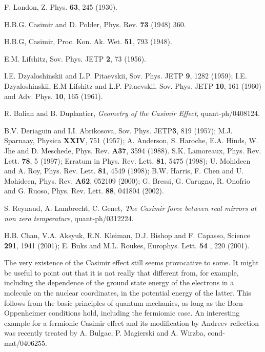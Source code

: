 \documentclass[prl,nofootinbib,twocolumn,showpacs]{revtex4}
\begin{document}
\begin{thebibliography}{99}
 F. London, Z. Phys. {\bf 63}, 245 (1930).

 H.B.G. Casimir and D. Polder, Phys. Rev. {\bf 73} (1948) 360.

 H.B.G, Casimir, Proc. Kon. Ak. Wet. {\bf 51}, 793 (1948).

 E.M. Lifshitz, Sov. Phys. JETP {\bf 2}, 73 (1956).

 I.E. Dzyaloshinskii and L.P. Pitaevskii, Sov. Phys. JETP
{\bf 9}, 1282 (1959); I.E. Dzyaloshinskii, E.M Lifshitz and L.P. Pitaevskii, Sov. Phys. JETP {\bf 10}, 161 (1960) and Adv. Phys. {\bf 10}, 165 (1961).

 R. Balian and B. Duplantier, {\it Geometry of the Casimir Effect},
quant-ph/0408124.

  B.V. Deriaguin and I.I. Abrikosova, Sov. Phys. JETP{\bf  3},
819 (1957); M.J. Sparnaay, Physica {\bf XXIV}, 751 (1957);
A. Anderson, S. Haroche, E.A. Hinds, W. Jhe and D. Meschede, Phys. Rev. {\bf A37}, 3594
(1988).
S.K. Lamoreaux, Phys. Rev. Lett. {\bf 78}, 5 (1997); Erratum
in Phys. Rev. Lett. {\bf 81}, 5475 (1998); U. Mohideen and A. Roy, Phys. Rev. Lett. {\bf
81}, 4549 (1998); B.W. Harris, F. Chen and U. Mohideen, Phys. Rev. {\bf A62},
052109 (2000);  G. Bressi, G. Carugno, R. Onofrio and G. Ruoso, Phys.
Rev. Lett. {\bf 88}, 041804 (2002).

 S. Reynaud, A. Lambrecht, C. Genet,
{\it The Casimir force between real mirrors at non zero temperature},
quant-ph/0312224.


 H.B. Chan, V.A. Aksyuk, R.N. Kleiman, D.J. Bishop and
F. Capasso, Science {\bf 291}, 1941 (2001); E. Buks and M.L. Roukes, Europhys. Lett.
{\bf 54} , 220 (2001).

 The very existence of the Casimir effect still seems provocative to some.
It might be useful to point out that it is not really that different from, for example,
including the dependence of the   ground  state energy of the electrons in a molecule on
the nuclear coordinates, in the potential energy of the latter. This follows from the
basic principles of quantum mechanics, as long as the Born-Oppenheimer conditions hold,
including the fermiomic case. An interesting example for a fermionic Casimir effect and
its modification by Andreev reflection was recently treated by A. Bulgac, P. Magierski
and A. Wirzba, cond-mat/0406255.





\end{thebibliography}
\end{document}

